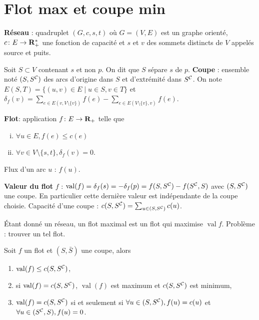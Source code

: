 \documentclass[a4paper,11pt,twocolumn]{article}
\DeclareMathOperator{\val}{val}
\begin{document}
\section{Flot max et coupe min}

	\begin{defn}
	\textbf{Réseau} : quadruplet $(G,c,s,t)$ où $G = (V,E)$ est un graphe orienté, $c \colon E \to \mathbf{R}_+^*$ une fonction de capacité et $s$ et $v$ des sommets distincts de $V$ appelés source et puits.
	\end{defn}

	\begin{note}
	Soit $S \subset V$ contenant $s$ et non $p$.
	On dit que $S$ sépare $s$ de $p$.
	\textbf{Coupe} : ensemble noté $(S,{S}^{\mathcal{C}})$ des arcs d'origine dans $S$ et d'extrémité dans ${S}^{\mathcal{C}}$.
	On note $E(S,T) = \{ (u,v) \in E \mid u \in S, v \in T \}$ et $\delta_f(v) = \sum_{e \in E(v,V \setminus \{ v \})} f(e) - \sum_{e \in E(V \setminus \{ v \},v)} f(e)$.
	\end{note}

	\begin{defn}
	\textbf{Flot}: application $f \colon E \to \mathbf{R}_+$ telle que
		\begin{enumerate}[i)]
		\item $\forall u \in E, f(e) \leq c(e)$
		\item $\forall v \in V \setminus \{ s,t \}, \delta_f(v) = 0$.
		\end{enumerate}
	Flux d'un arc $u$ : $f(u)$.
	\end{defn}

	\begin{defn}
	\textbf{Valeur du flot} $f$ : $\val(f) = \delta_f(s) = - \delta_f(p) = f(S,\compl{S}) - f(\compl{S},S)$ avec $(S,{S}^{\mathcal{C}})$ une coupe.
	En particulier cette dernière valeur est indépendante de la coupe choisie.
	Capacité d'une coupe : $c(S,{S}^{\mathcal{C}}) = \sum_{u \in (S,{S}^{\mathcal{C}})} c(u)$.
	\end{defn}

	\begin{defn}
	Étant donné un réseau, un flot maximal est un flot qui maximise $\val{f}$.
	Problème :  trouver un tel flot.
	\end{defn}

	\begin{thm}
	Soit $f$ un flot et $(S,\bar{S})$ une coupe, alors
		\begin{enumerate}
		\item $\val(f) \leq c(S,\compl{S})$,
		\item si $\val(f) = c(S,\compl{S})$, $\val(f)$ est maximum et $c(S,{S}^{\mathcal{C}})$ est minimum,
		\item $\val(f) = c(S,\compl{S})$ si et seulement si $\forall u \in (S,{S}^{\mathcal{C}}), f(u) = c(u)$ et $\forall u \in ({S}^{\mathcal{C}},S), f(u) = 0$.
		\end{enumerate}
	\end{thm}
\end{document}
